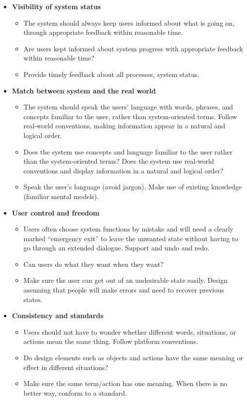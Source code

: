 \begin{itemize}
	\item \textbf{Visibility of system status}
		\begin{itemize}
			\item The system should always keep users informed about what is going on, through appropriate feedback within reasonable time.
			\item Are users kept informed about system progress with appropriate feedback within reasonable time?
			\item Provide timely feedback about all processes, system status.
		\end{itemize}
		
	\item \textbf{Match between system and the real world}
		\begin{itemize}
			\item The system should speak the users' language with words, phrases, and concepts familiar to the user, rather than system-oriented terms. Follow real-world conventions, making information appear in a natural and logical order.
			\item Does the system use concepts and language familiar to the user rather than the system-oriented terms? Does the system use real-world conventions and display information in a natural and logical order?
			\item Speak the user's language (avoid jargon). Make use of existing knowledge (familiar mental models).
		\end{itemize}
		
	\item \textbf{User control and freedom}
		\begin{itemize}
			\item Users often choose system functions by mistake and will need a clearly marked ``emergency exit'' to leave the unwanted state without having to go through an extended dialogue. Support and undo and redo.
			\item Can users do what they want when they want?
			\item Make sure the user can get out of an undesirable state easily. Design assuming that people will make errors and need to recover previous states.
		\end{itemize}
		
	\item \textbf{Consistency and standards}
		\begin{itemize}
			\item Users should not have to wonder whether different words, situations, or actions mean the same thing. Follow platform conventions.
			\item Do design elements such as objects and actions have the same meaning or effect in different situations?
			\item Make sure the same term/action has one meaning. When there is no better way, conform to a standard.
		\end{itemize}
		

\end{itemize}
